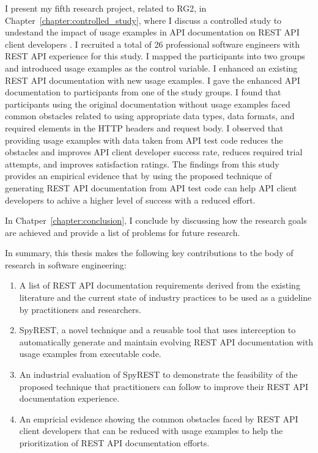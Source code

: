 I present my fifth research project, related to RG2, in Chapter~\ref{chapter:controlled_study}, where I discuss a controlled study to undestand the impact of usage examples in API documentation on REST API client developers \cite{sohan_vlhcc}. I recruited a total of 26 professional software engineers with REST API experience for this study. I mapped the participants into two groups and introduced usage examples as the control variable. I enhanced an existing REST API documentation with new usage examples. I gave the enhanced API documentation to participants from one of the study groups. I found that participants using the original documentation without usage examples faced common obstacles related to using appropriate data types, data formats, and required elements in the HTTP headers and request body. I observed that providing usage examples with data taken from API test code reduces the obstacles and improves API client developer success rate, reduces required trial attempts, and improves satisfaction ratings. The findings from this study provides an empirical evidence that by using the proposed technique of generating REST API documentation from API test code can help API client developers to achive a higher level of success with a reduced effort.

In Chatper~\ref{chapter:conclusion}, I conclude by discussing how the research goals are achieved and provide a list of problems for future research.

In summary, this thesis makes the following key contributions to the body of research in software engineering:

\begin{enumerate}
  \item A list of REST API documentation requirements derived from the existing literature and the current state of industry practices to be used as a guideline by practitioners and researchers.
  \item SpyREST, a novel technique and a reusable tool that uses interception to automatically generate and maintain evolving REST API documentation with usage examples from executable code.
  \item An industrial evaluation of SpyREST to demonstrate the feasibility of the proposed technique that practitioners can follow to improve their REST API documentation experience.
  \item An empricial evidence showing the common obstacles faced by REST API client developers that can be reduced with usage examples to help the prioritization of REST API documentation efforts.
\end{enumerate}






